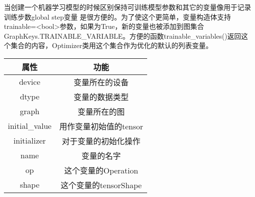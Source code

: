 当创建一个机器学习模型的时候区别保持可训练模型参数和其它的变量像用于记录训练步数global step变量 是很方便的。为了使这个更简单，变量构造体支持trainable=<bool>参数，如果为True，新的变量也被添加到图集合GraphKeys.TRAINABLE\_VARIABLE。方便的函数trainable\_variables()返回这个集合的内容，Optimizer类用这个集合作为优化的默认的列表变量。
\begin{center}
\begin{tabular}{|c|c|}
\hline
属性&功能\\
\hline
device&变量所在的设备\\
\hline
dtype&变量的数据类型\\
\hline
graph&变量所在的图\\
\hline
initial\_value&用作变量初始值的tensor\\
\hline
initializer&对于变量的初始化操作\\
\hline
name&变量的名字\\
\hline
op&这个变量的Operation\\
\hline
shape&这个变量的tensorShape\\
\hline
\end{tabular}
\end{center}
